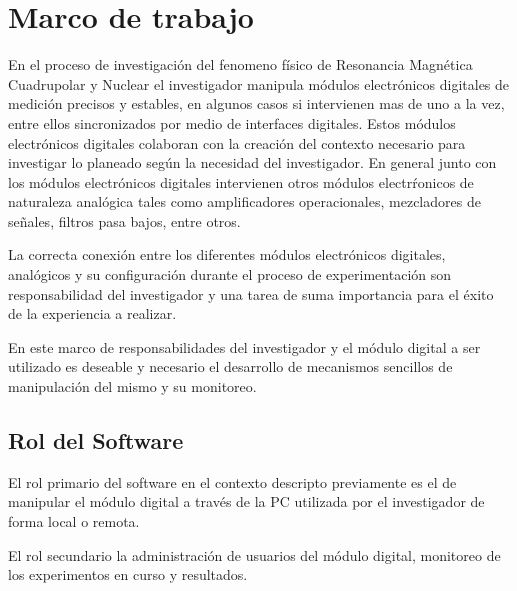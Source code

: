 \section{Marco de trabajo}

En el proceso de investigaci\'on del fenomeno f\'isico de Resonancia Magn\'etica Cuadrupolar y Nuclear 
el investigador manipula m\'odulos electr\'onicos digitales de medici\'on precisos 
y estables, en algunos casos si intervienen mas de uno a la vez, entre ellos sincronizados 
por medio de interfaces digitales. 
Estos m\'odulos electr\'onicos digitales colaboran con la creaci\'on del contexto necesario 
para investigar lo planeado seg\'un la necesidad del investigador.
En general junto con los m\'odulos electr\'onicos digitales intervienen otros m\'odulos electr\'ronicos de 
naturaleza anal\'ogica tales como amplificadores operacionales, mezcladores de señales, 
filtros pasa bajos, entre otros.

La correcta conexi\'on entre los diferentes m\'odulos electr\'onicos digitales, anal\'ogicos y su configuraci\'on durante el proceso de experimentaci\'on son responsabilidad del investigador y una tarea de suma importancia para el \'exito de la experiencia a realizar.

En este marco de responsabilidades del investigador y el m\'odulo digital a ser utilizado es deseable 
y necesario el desarrollo de mecanismos sencillos de manipulaci\'on del mismo y su monitoreo.

\subsection{Rol del Software}

El rol primario del software en el contexto descripto previamente es el de manipular 
el m\'odulo digital a trav\'es de la PC utilizada por el investigador de forma local o remota.

El rol secundario la administraci\'on de usuarios del m\'odulo digital, monitoreo de los experimentos en curso y resultados.

\newpage

